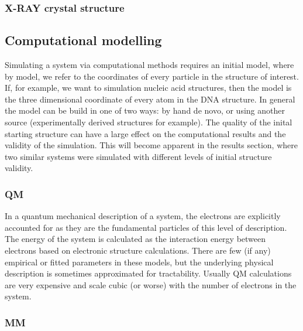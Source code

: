 \documentclass{report}
\begin{document}
\subsubsection{X-RAY crystal structure}

\subsection{Computational modelling}

Simulating a system via computational methods requires an initial model, where by model, we refer to the coordinates of every particle in the structure of interest. If, for example, we want to simulation nucleic acid structures, then the model is the three dimensional coordinate of every atom in the DNA structure. In general the model can be build in one of two ways: by hand de novo, or using another source (experimentally derived structures for example). The quality of the inital starting structure can have a large effect on the computational results and the validity of the simulation. This will become apparent in the results section, where two similar systems were simulated with different levels of initial structure validity.   

\subsubsection{QM}

In a quantum mechanical description of a system, the electrons are explicitly accounted for as they are the fundamental particles of this level of description. The energy of the system is calculated as the interaction energy between electrons based on electronic structure calculations. There are few (if any) empirical or fitted parameters in these models, but the underlying physical description is sometimes approximated for tractability. Usually QM calculations are very expensive and scale cubic (or worse) with the number of electrons in the system.

\subsubsection{MM}
\end{document}
